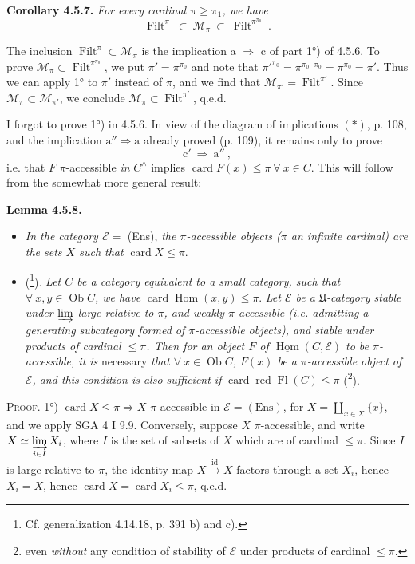 \documentclass[11pt]{article}
\newcommand{\printedpage}[1]{\marginpar{\footnotesize p.~#1}}
\newcommand{\msp}[1]{\marginpar{\footnotesize [#1]}}
\newcommand{\Filt}{\operatorname{Filt}}
\newcommand{\Ob}{\operatorname{Ob}}
\newcommand{\card}{\operatorname{card}}
\newcommand{\Fl}{\operatorname{Fl}}
\newcommand{\Hom}{\operatorname{Hom}}
\newcommand{\uHom}{\underline{\operatorname{Hom}}}
\newcommand{\Ens}{\mathrm{Ens}}
\begin{document}
\textbf{Corollary 4.5.7.} \textit{For every cardinal $\pi \geqslant \pi_1$, we have}
\[
\Filt^\pi \ \subset \ \mathcal{M}_\pi \ \subset \ \Filt^{\pi^{\pi_0}} \ . \tag*{(4.5.7.1)}
\]

The inclusion $\Filt^\pi \subset \mathcal{M}_\pi$ is the implication a $\Longrightarrow$ c of part 1°) of 4.5.6. To prove $\mathcal{M}_\pi \subset \Filt^{\pi^{\pi_0}}$, we put $\pi' = \pi^{\pi_0}$ and note that $\pi'^{\pi_0} = \pi^{\pi_0 \cdot \pi_0} = \pi^{\pi_0} = \pi'$. Thus we can
\printedpage{35}
apply 1° to $\pi'$ instead of $\pi$, and we find that $\mathcal{M}_{\pi'} = \Filt^{\pi'}$. Since $\mathcal{M}_\pi \subset \mathcal{M}_{\pi'}$, we conclude $\mathcal{M}_\pi \subset \Filt^{\pi'}$, q.e.d.

I forgot to prove 1°) in 4.5.6. In view of the diagram of implications $(\ast)$, p. 108, and the implication $\mathrm{a}'' \Longrightarrow \mathrm{a}$ already proved (p. 109),
\msp{page 119}
it remains only to prove
\[
\mathrm{c}' \ \Longrightarrow \ \mathrm{a}'' \ ,
\]
i.e. that $F$ $\pi$-accessible \textit{in} $C^\wedge$ implies $\card F(x) \leqslant \pi \ \forall \ x \in C$. This will follow from the somewhat more general result:

\textbf{Lemma 4.5.8.}
\begin{itemize}[leftmargin=3em]
\item[\textit{1°)}] \textit{In the category $\mathcal{E} = $} (Ens), \textit{the $\pi$-accessible objects ($\pi$ an infinite cardinal) are the sets $X$ such that} $\card X \leqslant \pi$.
\item[\textit{2°)}] (\footnote{Cf. generalization 4.14.18, p. 391 b) and c).}). \textit{Let $C$ be a category equivalent to a small category, such that $\forall \ x, y \in \Ob C$, we have} $\card \Hom(x,y) \leqslant \pi$. \textit{Let $\mathcal{E}$ be a $\mathfrak{U}$-category stable under $\varinjlim$ large relative to $\pi$, and weakly $\pi$-accessible (i.e. admitting a generating subcategory formed of $\pi$-accessible objects), and stable under products of cardinal $\leqslant \pi$. Then for an object $F$ of $\uHom(C,\mathcal{E})$ to be $\pi$-accessible, it is} necessary \textit{that $\forall \ x \in \Ob C$, $F(x)$ be a $\pi$-accessible object of $\mathcal{E}$, and this condition is also sufficient if} $\card \operatorname{\text{red}} \Fl(C) \leqslant \pi$ (\footnote{even \textit{without} any condition of stability of $\mathcal{E}$ under products of cardinal $\leqslant \pi$.}).
\end{itemize}

\textsc{Proof.} 1°) $\card X \leqslant \pi \Longrightarrow X$ $\pi$-accessible in $\mathcal{E} = (\Ens)$, for $X = \coprod_{x \in X} \{x\}$, and we apply SGA 4 I 9.9. Conversely, suppose $X$ $\pi$-accessible, and write $X \simeq \varinjlim\limits_{i \in I} X_i$, where $I$ is the set of subsets of $X$ which are of cardinal $\leqslant \pi$. Since $I$ is large relative to $\pi$, the identity map $X \xrightarrow{\ \mathrm{id}\ } X$ factors through a set $X_i$, hence $X_i = X$, hence $\card X = \card X_i \leqslant \pi$, q.e.d.
\end{document}
